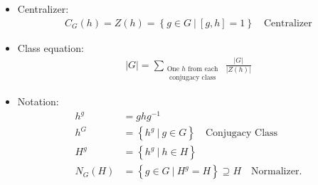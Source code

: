 \begin{concept}

\envlist

\begin{itemize}
\tightlist
\item
  Centralizer:
  \begin{align*}
  C_G(h) = Z(h) = \left\{{g\in G {~\mathrel{\Big|}~}[g,h] = 1}\right\}
  \quad\text{Centralizer}
  \end{align*}
\item
  Class equation:
  \begin{align*}
  {\left\lvert {G} \right\rvert} = \sum_{\substack{\text{One $h$ from each } \\ \text{ conjugacy class}}} \frac{{\left\lvert {G} \right\rvert}}{{\left\lvert {Z(h)} \right\rvert}}
  \end{align*}
\item
  Notation:
  \begin{align*}
  h^g &= ghg^{-1}\\
  h^G &= \left\{{ h^g {~\mathrel{\Big|}~}g\in G}\right\} \quad\text{Conjugacy Class}\\
  H^g &= \left\{{h^g {~\mathrel{\Big|}~}h\in H}\right\} \\
  N_G(H) &= \left\{{g\in G {~\mathrel{\Big|}~}H^g = H}\right\} \supseteq H \quad\text{Normalizer}
  .\end{align*}
\end{itemize}

\end{concept}

